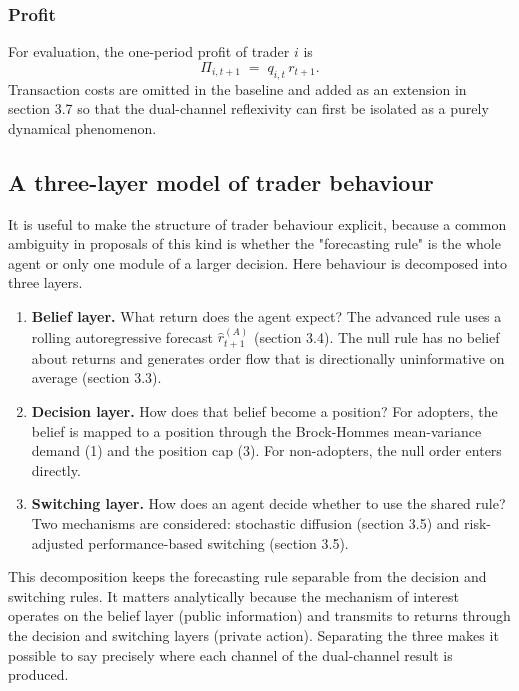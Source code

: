 \documentclass[11pt]{article}
\begin{document}
\subsubsection{Profit}

For evaluation, the one-period profit of trader $i$ is
\begin{equation}
  \Pi_{i,t+1} \;=\; q_{i,t}\, r_{t+1}.
\end{equation}
Transaction costs are omitted in the baseline and added as an extension in section 3.7 so that the dual-channel reflexivity can first be isolated as a purely dynamical phenomenon.


\subsection{A three-layer model of trader behaviour}

It is useful to make the structure of trader behaviour explicit, because a common ambiguity in proposals of this kind is whether the "forecasting rule" is the whole agent or only one module of a larger decision. Here behaviour is decomposed into three layers.

\begin{enumerate}[itemsep=0.2em]
  \item \textbf{Belief layer.} What return does the agent expect? The advanced rule uses a rolling autoregressive forecast $\hat{r}_{t+1}^{(A)}$ (section 3.4). The null rule has no belief about returns and generates order flow that is directionally uninformative on average (section 3.3).
  \item \textbf{Decision layer.} How does that belief become a position? For adopters, the belief is mapped to a position through the Brock-Hommes mean-variance demand (1) and the position cap (3). For non-adopters, the null order enters directly.
  \item \textbf{Switching layer.} How does an agent decide whether to use the shared rule? Two mechanisms are considered: stochastic diffusion (section 3.5) and risk-adjusted performance-based switching (section 3.5).
\end{enumerate}

This decomposition keeps the forecasting rule separable from the decision and switching rules. It matters analytically because the mechanism of interest operates on the belief layer (public information) and transmits to returns through the decision and switching layers (private action). Separating the three makes it possible to say precisely where each channel of the dual-channel result is produced.
\end{document}
